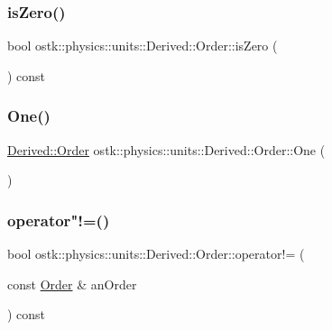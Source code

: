 \subsubsection{\texorpdfstring{is\+Zero()}{isZero()}}
{\footnotesize\ttfamily bool ostk\+::physics\+::units\+::\+Derived\+::\+Order\+::is\+Zero (\begin{DoxyParamCaption}{ }\end{DoxyParamCaption}) const}

\mbox{\label{classostk_1_1physics_1_1units_1_1_derived_1_1_order_a77d03df2a944480e73a8ad924a7fc74d}} 
\subsubsection{\texorpdfstring{One()}{One()}}
{\footnotesize\ttfamily \hyperlink{classostk_1_1physics_1_1units_1_1_derived_1_1_order}{Derived\+::\+Order} ostk\+::physics\+::units\+::\+Derived\+::\+Order\+::\+One (\begin{DoxyParamCaption}{ }\end{DoxyParamCaption})\hspace{0.3cm}{\ttfamily [static]}}

\mbox{\label{classostk_1_1physics_1_1units_1_1_derived_1_1_order_a2949ce7fa5cc33281fa83220795b4984}} 
\subsubsection{\texorpdfstring{operator"!=()}{operator!=()}}
{\footnotesize\ttfamily bool ostk\+::physics\+::units\+::\+Derived\+::\+Order\+::operator!= (\begin{DoxyParamCaption}\item[{const \hyperlink{classostk_1_1physics_1_1units_1_1_derived_1_1_order}{Order} \&}]{an\+Order }\end{DoxyParamCaption}) const}


